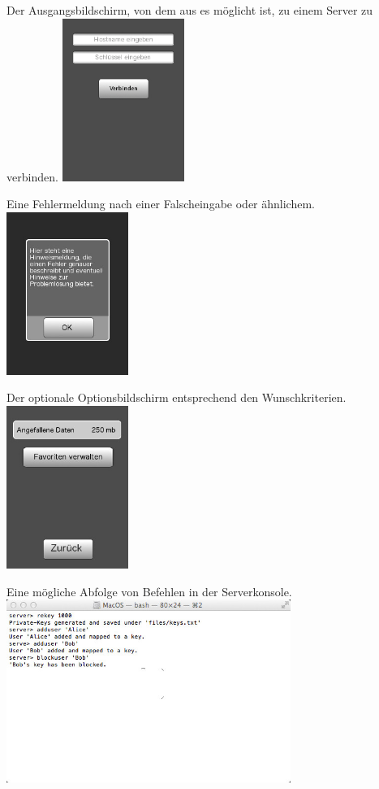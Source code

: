 \documentclass[a4paper,10pt]{scrartcl}
\begin{document}
\begin{illustration}{Der Ausgangsbildschirm, von dem aus es möglicht ist, zu einem Server zu verbinden.}
\includegraphics[width=150px]{figures/images/homescreen.jpg}
\end{illustration}
\begin{illustration}{Eine Fehlermeldung nach einer Falscheingabe oder ähnlichem.}
\includegraphics[width=150px]{figures/images/alert.jpg}
\end{illustration}
\begin{illustration}{Der optionale Optionsbildschirm entsprechend den Wunschkriterien.}
\includegraphics[width=150px]{figures/images/optionscreen.jpg}
\end{illustration}
\begin{illustration}{Eine mögliche Abfolge von Befehlen in der Serverkonsole.}
\includegraphics[width=350px]{figures/images/serverterminal.jpg}
\end{illustration}
\end{document}
